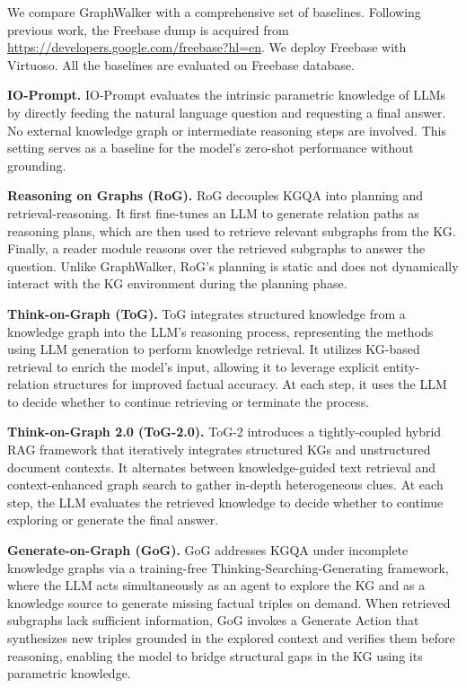 
We compare GraphWalker with a comprehensive set of baselines.
Following previous work, the Freebase dump is acquired from \url{https://developers.google.com/freebase?hl=en}. 
We deploy Freebase with Virtuoso. 
All the baselines are evaluated on Freebase database.


\textbf{IO-Prompt.}
IO-Prompt evaluates the intrinsic parametric knowledge of LLMs by directly feeding the natural language question and requesting a final answer. No external knowledge graph or intermediate reasoning steps are involved. This setting serves as a baseline for the model's zero-shot performance without grounding.


\textbf{Reasoning on Graphs (RoG).}
RoG \citep{luo2023reasoning} decouples KGQA into planning and retrieval-reasoning. It first fine-tunes an LLM to generate relation paths as reasoning plans, which are then used to retrieve relevant subgraphs from the KG. Finally, a reader module reasons over the retrieved subgraphs to answer the question. Unlike GraphWalker, RoG's planning is static and does not dynamically interact with the KG environment during the planning phase.

\textbf{Think-on-Graph (ToG).} 
ToG \citep{sun2023think} integrates structured knowledge from a knowledge graph into the LLM’s reasoning process, representing the methods using LLM generation to perform knowledge retrieval. It utilizes KG-based retrieval to enrich the model’s input, allowing it to leverage explicit entity-relation structures for improved factual accuracy. At each step, it uses the LLM to decide whether to continue retrieving or terminate the process.

\textbf{Think-on-Graph 2.0 (ToG-2.0).}
ToG-2 \citep{ma2025thinkongraph20deepfaithful} introduces a tightly-coupled hybrid RAG framework that iteratively integrates structured KGs and unstructured document contexts. It alternates between knowledge-guided text retrieval and context-enhanced graph search to gather in-depth heterogeneous clues. At each step, the LLM evaluates the retrieved knowledge to decide whether to continue exploring or generate the final answer.


 
\textbf{Generate-on-Graph (GoG).}
GoG \citep{xu2024generate} addresses KGQA under incomplete knowledge graphs via a training-free Thinking-Searching-Generating framework, where the LLM acts simultaneously as an agent to explore the KG and as a knowledge source to generate missing factual triples on demand. When retrieved subgraphs lack sufficient information, GoG invokes a Generate Action that synthesizes new triples grounded in the explored context and verifies them before reasoning, enabling the model to bridge structural gaps in the KG using its parametric knowledge.

